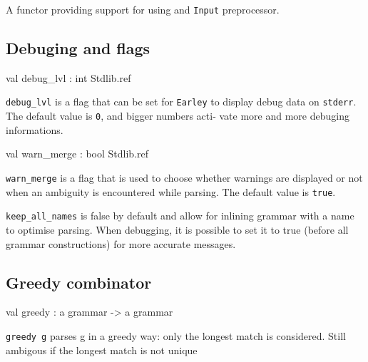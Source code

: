 \documentclass[11pt]{article}
\begin{document}
A functor providing support for using and {\tt{Input}} preprocessor.



\subsection{Debuging and flags}




\label{val:Earley.debug-underscorelvl}\begin{ocamldoccode}
val debug_lvl : int Stdlib.ref
\end{ocamldoccode}
\begin{ocamldocdescription}
{\tt{debug\_lvl}} is a flag that can be set for {\tt{Earley}} to display  debug
    data on {\tt{stderr}}. The default value is {\tt{0}}, and bigger numbers acti-
    vate more and more debuging informations.


\end{ocamldocdescription}




\label{val:Earley.warn-underscoremerge}\begin{ocamldoccode}
val warn_merge : bool Stdlib.ref
\end{ocamldoccode}
\begin{ocamldocdescription}
{\tt{warn\_merge}} is a flag that is used to choose whether  warnings  are
    displayed or not when an ambiguity is encountered while parsing. The
    default value is {\tt{true}}.


\end{ocamldocdescription}




{\tt{keep\_all\_names}} is false by default and allow for inlining  grammar
    with a name to optimise parsing.  When debugging,  it is possible to
    set it to true  (before all grammar constructions) for more accurate
    messages.



\subsection{Greedy combinator}




\label{val:Earley.greedy}\begin{ocamldoccode}
val greedy : {\textquotesingle}a grammar -> {\textquotesingle}a grammar
\end{ocamldoccode}
\begin{ocamldocdescription}
{\tt{greedy g}} parses g in a greedy way: only the longest match is considered.
    Still ambigous if the longest match is not unique


\end{ocamldocdescription}
\end{document}
